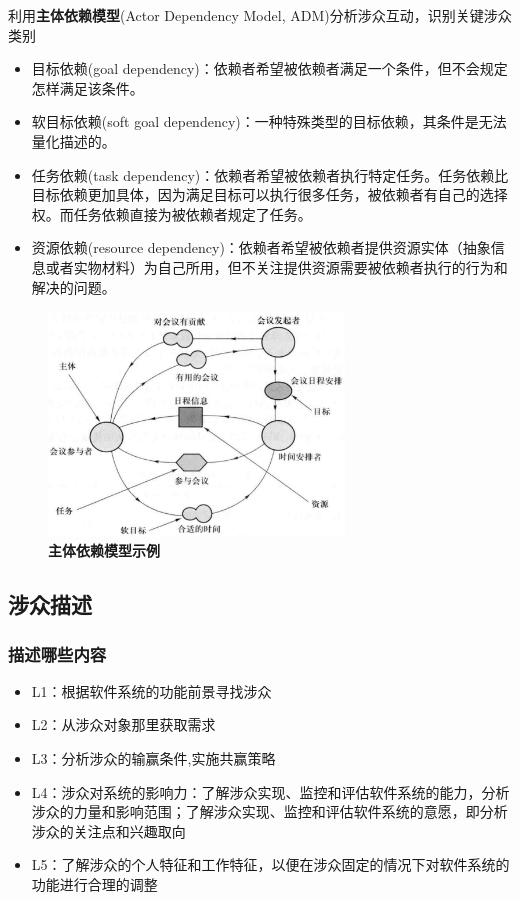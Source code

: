利用\textbf{主体依赖模型}(Actor Dependency Model, ADM)分析涉众互动，识别关键涉众类别
\begin{itemize}
    \item 目标依赖(goal dependency)：依赖者希望被依赖者满足一个条件，但不会规定怎样满足该条件。
    \item 软目标依赖(soft goal dependency)：一种特殊类型的目标依赖，其条件是无法量化描述的。
    \item 任务依赖(task dependency)：依赖者希望被依赖者执行特定任务。任务依赖比目标依赖更加具体，因为满足目标可以执行很多任务，被依赖者有自己的选择权。而任务依赖直接为被依赖者规定了任务。
    \item 资源依赖(resource dependency)：依赖者希望被依赖者提供资源实体（抽象信息或者实物材料）为自己所用，但不关注提供资源需要被依赖者执行的行为和解决的问题。  
\end{itemize}
\begin{figure}[H]
	\centering
	\includegraphics[width=0.7\textwidth]{img/主体依赖模型示例.png}
    \caption*{\textbf{主体依赖模型示例}}
    \vspace{-1em}
\end{figure}

\subsection{涉众描述}

\subsubsection{描述哪些内容}
\begin{itemize}
    \item L1：根据软件系统的功能前景寻找涉众
    \item L2：从涉众对象那里获取需求
    \item L3：分析涉众的输赢条件,实施共赢策略 
    \item L4：涉众对系统的影响力：了解涉众实现、监控和评估软件系统的能力，分析涉众的力量和影响范围；了解涉众实现、监控和评估软件系统的意愿，即分析涉众的关注点和兴趣取向
    \item L5：了解涉众的个人特征和工作特征，以便在涉众固定的情况下对软件系统的功能进行合理的调整  
\end{itemize}

